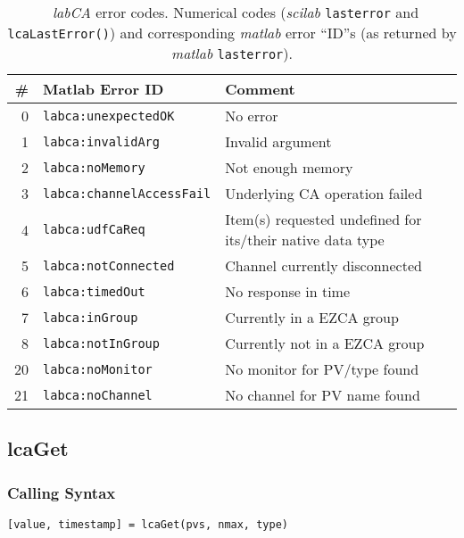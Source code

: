 \documentclass{article}
\newcommand{\sca}{\ita{labCA}}
\newcommand{\scilab}{\ita{scilab}}
\newcommand{\matlab}{\ita{matlab}}
\newcommand{\com}[1]{{\tt #1}}
\newcommand{\pbrk}{\pagebreak[3]}
\newcommand{\ita}[1]{\emph{#1}}
\renewcommand{\pbrk}{}
\begin{document}
\begin{table}[h]
\begin{tabular}{r|l|p{5.5cm}}
	\#                   &      Matlab Error ID         & Comment \\
	\hline
	0                    & \com{labca:unexpectedOK}     & No error \\
    1                    & \com{labca:invalidArg}       & Invalid argument \\
    2                    & \com{labca:noMemory}         & Not enough memory \\
    3                    & \com{labca:channelAccessFail}& Underlying CA operation failed \\
    4                    & \com{labca:udfCaReq}         & Item(s) requested undefined for its/their native data type\\
    5                    & \com{labca:notConnected}     & Channel currently disconnected\\
    6                    & \com{labca:timedOut}         & No response in time \\
    7                    & \com{labca:inGroup}          & Currently in a EZCA group\\
    8                    & \com{labca:notInGroup}       & Currently not in a EZCA group\\
    20                   & \com{labca:noMonitor}        & No monitor for PV/type found\\
    21                   & \com{labca:noChannel}        & No channel for PV name found\\
\end{tabular}
\caption{~\sca{} error codes. Numerical codes (\scilab{} \com{lasterror} and
\com{lcaLastError()}) and corresponding \matlab{} error ``ID''s
(as returned by \matlab{} \com{lasterror}).}
\label{tbl:errors}
\end{table}


\vspace*{\fill}
\pbrk
\subsection{lcaGet}
\label{lcaget}
\subsubsection{Calling Syntax}
\begin{verbatim}
[value, timestamp] = lcaGet(pvs, nmax, type)
\end{verbatim}
\end{document}
